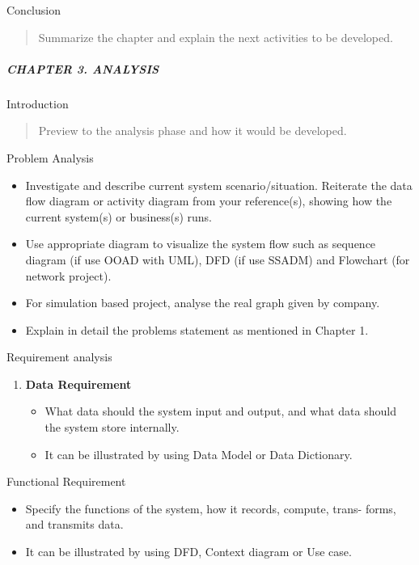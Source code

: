 \documentclass[12pt,a4paper]{article}
\begin{document}
Conclusion

\begin{quote}
Summarize the chapter and explain the next activities to be developed.
\end{quote}

\subparagraph{CHAPTER 3. ANALYSIS}\label{chapter-3.-analysis}

Introduction

\begin{quote}
Preview to the analysis phase and how it would be developed.
\end{quote}

Problem Analysis

\begin{itemize}
\item
  Investigate and describe current system scenario/situation. Reiterate
  the data flow diagram or activity diagram from your reference(s),
  showing how the current system(s) or business(s) runs.
\item
  Use appropriate diagram to visualize the system flow such as sequence
  diagram (if use OOAD with UML), DFD (if use SSADM) and Flowchart (for
  network project).
\item
  For simulation based project, analyse the real graph given by company.
\item
  Explain in detail the problems statement as mentioned in Chapter 1.
\end{itemize}

Requirement analysis

\begin{enumerate}
\def\labelenumi{\arabic{enumi}.}
\item
  \textbf{Data Requirement}

  \begin{itemize}
  \item
    What data should the system input and output, and what data should
    the system store internally.
  \item
    It can be illustrated by using Data Model or Data Dictionary.
  \end{itemize}
\end{enumerate}

Functional Requirement

\begin{itemize}
\item
  Specify the functions of the system, how it records, compute, trans-
  forms, and transmits data.
\item
  It can be illustrated by using DFD, Context diagram or Use case.
\end{itemize}
\end{document}
